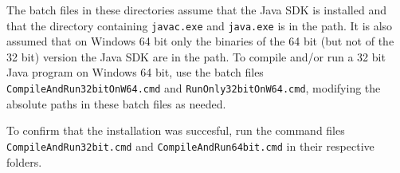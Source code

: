 \vpara
The batch files in these directories assume that the Java SDK is installed and that the directory containing \verb|javac.exe| and \verb|java.exe| is in the path. It is also assumed that on Windows 64 bit only the binaries of the 64 bit (but not of the 32 bit) version the Java SDK are in the path. To compile and/or run a 32 bit Java program on Windows 64 bit, use the batch files \verb|CompileAndRun32bitOnW64.cmd| and \verb|RunOnly32bitOnW64.cmd|, modifying the absolute paths in these batch files as needed.

\vpara
To confirm that the installation was succesful, run the command files \verb|CompileAndRun32bit.cmd| and  \verb|CompileAndRun64bit.cmd| in their respective folders.






%
%
%
%
%
%
%
